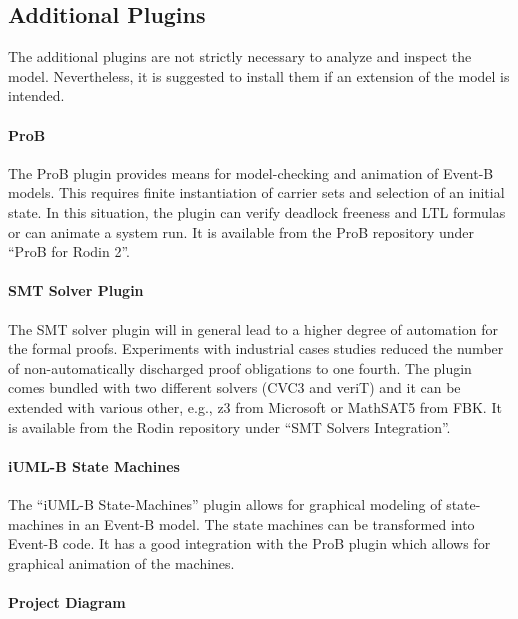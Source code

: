 \documentclass[10pt,a4paper]{article}
\begin{document}
\subsection{Additional Plugins}
\label{sec:additional-plugins}

The additional plugins are not strictly necessary to analyze and inspect the
model. Nevertheless, it is suggested to install them if an extension of the
model is intended.

\paragraph{ProB}
\label{sec:prob}

The ProB plugin provides means for model-checking and animation of Event-B
models. This requires finite instantiation of carrier sets and selection of an
initial state. In this situation, the plugin can verify deadlock freeness and
LTL formulas or can animate a system run. It is available from the ProB
repository under ``ProB for Rodin 2''.

\paragraph{SMT Solver Plugin}
\label{sec:smt-solver-plugin}

The SMT solver plugin will in general lead to a higher degree of automation for
the formal proofs. Experiments with industrial cases studies reduced the number
of non-automatically discharged proof obligations to one fourth. The plugin
comes bundled with two different solvers (CVC3 and veriT) and it can be extended
with various other, e.g., z3 from Microsoft or MathSAT5 from FBK. It is
available from the Rodin repository under ``SMT Solvers Integration''.

\paragraph{iUML-B State Machines}
\label{sec:iuml-b-state}

The ``iUML-B State-Machines'' plugin allows for graphical modeling of
state-machines in an Event-B model. The state machines can be transformed into
Event-B code. It has a good integration with the ProB plugin which allows for
graphical animation of the machines.

\paragraph{Project Diagram}
\label{sec:project-diagram}
\end{document}
